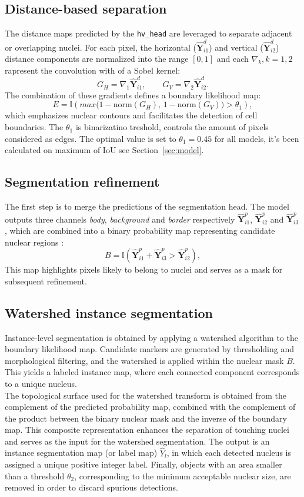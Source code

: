 \documentclass[target=bach,aauheader=,style=]{thud}
\begin{document}
\subsection{Distance-based separation}
The distance maps predicted by the \texttt{hv\_head} are leveraged to separate adjacent or overlapping nuclei. 
For each pixel, the horizontal ($\widehat{\mathbf{Y}}^d_{i1}$) and vertical ($\widehat{\mathbf{Y}}^d_{i2}$) distance components are normalized into the range $[0,1]$ and each $\nabla_k,k=1,2$ rapresent the convolution with of a Sobel kernel:
\[
G_H = \nabla_1 \widehat{\mathbf{Y}}^d_{i1}, \qquad G_V = \nabla_2 \widehat{\mathbf{Y}}^d_{i2}.
\]
The combination of these gradients defines a boundary likelihood map:
\[
E = \mathbb{I}(max \big( 1 - \text{norm}(G_H), \, 1 - \text{norm}(G_V) \big)> \theta_1),
\]
which emphasizes nuclear contours and facilitates the detection of cell boundaries. The $\theta_1$ is binarizatino treshold, controls the amount of pixels considered as edges. The optimal value is set to $\theta_1=0.45$ for all models, it's been calculated on maximum of IoU see Section~\ref{sec:model}.
\subsection{Segmentation refinement}

The first step is to merge the predictions of the segmentation head. 
The model outputs three channels \emph{body}, \emph{background} and \emph{border} respectively $\widehat{\mathbf{Y}}^p_{i1}$, $\widehat{\mathbf{Y}}^p_{i2}$ and $\widehat{\mathbf{Y}}^p_{i3}$, which are combined into a binary probability map representing candidate nuclear regions :
\[
B = \mathbb{I}(\widehat{\mathbf{Y}}^p_{i1} + \widehat{\mathbf{Y}}^p_{i3} > \widehat{\mathbf{Y}}^p_{i2}),
\] 
This map highlights pixels likely to belong to nuclei and serves as a mask for subsequent refinement.

\subsection{Watershed instance segmentation}
Instance-level segmentation is obtained by applying a watershed algorithm to the boundary likelihood map. 
Candidate markers are generated by thresholding and morphological filtering, and the watershed is applied within the nuclear mask $B$. 
This yields a labeled instance map, where each connected component corresponds to a unique nucleus.\\
The topological surface used for the watershed transform is obtained from the complement of the predicted probability map, combined with the complement of the product between the binary nuclear mask and the inverse of the boundary map. 
This composite representation enhances the separation of touching nuclei and serves as the input for the watershed segmentation. 
The output is an instance segmentation map (or label map) $\hat{Y}_l$, in which each detected nucleus is assigned a unique positive integer label. 
Finally, objects with an area smaller than a threshold $\theta_2$, corresponding to the minimum acceptable nuclear size, are removed in order to discard spurious detections.
\end{document}
